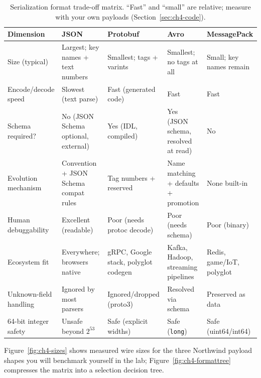 \begin{table}[h]
  \centering
  \small
  \begin{tabularx}{\textwidth}{l X X X X}
    \toprule
    \textbf{Dimension} & \textbf{JSON} & \textbf{Protobuf} & \textbf{Avro} & \textbf{MessagePack} \\
    \midrule
    Size (typical) & Largest; key names + text numbers & Smallest; tags + varints & Smallest; no tags at all & Small; key names remain \\
    Encode/decode speed & Slowest (text parse) & Fast (generated code) & Fast & Fast \\
    Schema required? & No (JSON Schema optional, external) & Yes (IDL, compiled) & Yes (JSON schema, resolved at read) & No \\
    Evolution mechanism & Convention + JSON Schema compat rules & Tag numbers + reserved & Name matching + defaults + promotion & None built-in \\
    Human debuggability & Excellent (readable) & Poor (needs protoc decode) & Poor (needs schema) & Poor (binary) \\
    Ecosystem fit & Everywhere; browsers native & gRPC, Google stack, polyglot codegen & Kafka, Hadoop, streaming pipelines & Redis, game/IoT, polyglot \\
    Unknown-field handling & Ignored by most parsers & Ignored/dropped (proto3) & Resolved via schema & Preserved as data \\
    64-bit integer safety & Unsafe beyond $2^{53}$ & Safe (explicit widths) & Safe (\texttt{long}) & Safe (uint64/int64) \\
    \bottomrule
  \end{tabularx}
  \caption{Serialization format trade-off matrix. ``Fast'' and ``small'' are relative;
           measure with your own payloads (Section~\ref{sec:ch4-code}).}
  \label{tab:ch4-format-matrix}
\end{table}

Figure~\ref{fig:ch4-sizes} shows measured wire sizes for the three Northwind payload
shapes you will benchmark yourself in the lab; Figure~\ref{fig:ch4-formattree}
compresses the matrix into a selection decision tree.

